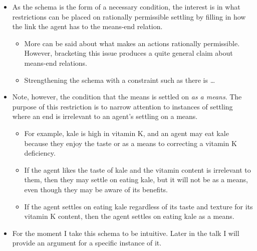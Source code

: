 \documentclass[10pt]{article}
\newcommand{\hand}{\ding{43}}
\begin{document}
\begin{itemize}
\item[\hand] As the schema is the form of a necessary condition, the interest is in what restrictions can be placed on rationally permissible settling by filling in how the link the agent has to the means-end relation.
  \begin{itemize}
  \item More can be said about what makes an actions rationally permissible.
    However, bracketing this issue produces a quite general claim about means-end relations.
  \item {\color{red} Strengthening the schema with a constraint such as there is \dots}
  \end{itemize}
\item Note, however, the condition that the means is settled on \emph{as a means}.
  The purpose of this restriction is to narrow attention to instances of settling where an end is irrelevant to an agent's settling on a means.
  \begin{itemize}
  \item For example, kale is high in vitamin K, and an agent may eat kale because they enjoy the taste or as a means to correcting a vitamin K deficiency.
  \item If the agent likes the taste of kale and the vitamin content is irrelevant to them, then they may settle on eating kale, but it will not be as a means, even though they may be aware of its benefits.
  \item If the agent settles on eating kale regardless of its taste and texture for its vitamin K content, then the agent settles on eating kale as a means.
  \end{itemize}
\end{itemize}

\begin{itemize}
\item For the moment I take this schema to be intuitive.
  Later in the talk I will provide an argument for a specific instance of it.
\end{itemize}
\end{document}
